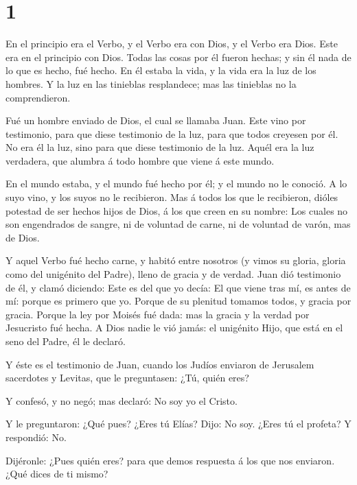 \hypertarget{section}{%
\section{1}\label{section}}

 En el principio era el Verbo, y el Verbo era con Dios, y el
Verbo era Dios.  Este era en el principio con Dios.
 Todas las cosas por él fueron hechas; y sin él nada de lo
que es hecho, fué hecho.  En él estaba la vida, y la vida
era la luz de los hombres.  Y la luz en las tinieblas
resplandece; mas las tinieblas no la comprendieron.

 Fué un hombre enviado de Dios, el cual se llamaba Juan.
 Este vino por testimonio, para que diese testimonio de la
luz, para que todos creyesen por él.  No era él la luz, sino
para que diese testimonio de la luz.  Aquél era la luz
verdadera, que alumbra á todo hombre que viene á este mundo.

 En el mundo estaba, y el mundo fué hecho por él; y el
mundo no le conoció.  A lo suyo vino, y los suyos no le
recibieron.  Mas á todos los que le recibieron, dióles
potestad de ser hechos hijos de Dios, á los que creen en su nombre:
 Los cuales no son engendrados de sangre, ni de voluntad de
carne, ni de voluntad de varón, mas de Dios.

 Y aquel Verbo fué hecho carne, y habitó entre nosotros (y
vimos su gloria, gloria como del unigénito del Padre), lleno de gracia y
de verdad.  Juan dió testimonio de él, y clamó diciendo:
Este es del que yo decía: El que viene tras mí, es antes de mí: porque
es primero que yo.  Porque de su plenitud tomamos todos, y
gracia por gracia.  Porque la ley por Moisés fué dada: mas
la gracia y la verdad por Jesucristo fué hecha.  A Dios
nadie le vió jamás: el unigénito Hijo, que está en el seno del Padre, él
le declaró.

 Y éste es el testimonio de Juan, cuando los Judíos
enviaron de Jerusalem sacerdotes y Levitas, que le preguntasen: ¿Tú,
quién eres?

 Y confesó, y no negó; mas declaró: No soy yo el Cristo.

 Y le preguntaron: ¿Qué pues? ¿Eres tú Elías? Dijo: No soy.
¿Eres tú el profeta? Y respondió: No.~

 Dijéronle: ¿Pues quién eres? para que demos respuesta á
los que nos enviaron. ¿Qué dices de ti mismo?

